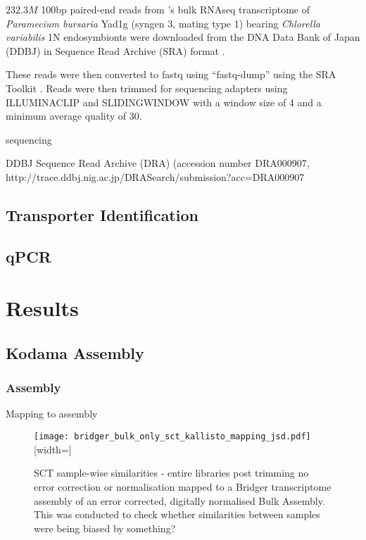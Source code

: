 \(232.3M\) 100bp paired-end reads from \citep{Kodama2014}'s 
bulk RNAseq transcriptome of \textit{Paramecium bursaria} Yad1g (syngen
3, mating type 1) bearing \textit{Chlorella variabilis} 1N endosymbionts
were downloaded from the DNA Data Bank of Japan (DDBJ) \citep{Tateno2002,Kaminuma2011}
in Sequence Read Archive (SRA) format \citep{Leinonen2011,KodamaNRA2012b}. 

These reads were then converted to fastq using ``fastq-dump'' using the SRA Toolkit
\citep{NationalCenterforBiotechnologyInformation2011}.  Reads were then trimmed
for sequencing adapters using ILLUMINACLIP and SLIDINGWINDOW with a window size
of 4 and a minimum average quality of 30.













sequencing


DDBJ Sequence Read Archive (DRA) (accession number DRA000907, http://trace.ddbj.nig.ac.jp/DRASearch/submission?acc=DRA000907



\subsection{Transporter Identification}

\subsection{qPCR}


\section{Results}


\subsection{Kodama Assembly}



\subsubsection{Assembly}

Mapping to assembly

\begin{figure}
	\texttt{[image: bridger\_bulk\_only\_sct\_kallisto\_mapping\_jsd.pdf]}[width=\textwidth]
	\caption{SCT sample-wise similarities - entire libraries post trimming
		no error correction or normalisation mapped to a Bridger transcriptome 
		assembly of an error corrected, digitally normalised Bulk Assembly.  
		This was conducted to check whether similarities between samples
		were being biased by something?}
	\label{fig:bridger_bulk_heatmap}
\end{figure}






